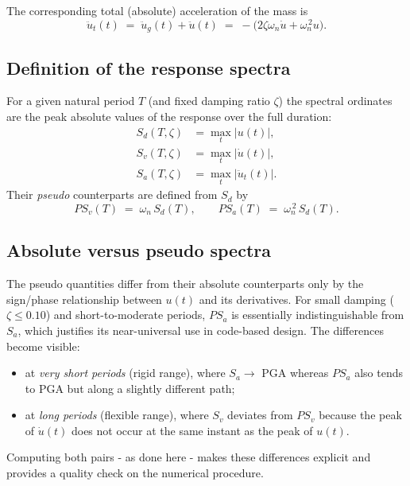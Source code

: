 \documentclass[11pt,a4paper]{article}
\begin{document}
The corresponding total (absolute) acceleration of the mass is
\begin{equation}
  \ddot{u}_t(t) \;=\; \ddot{u}_g(t) + \ddot{u}(t)
                  \;=\; -\bigl(2\zeta\omega_n\dot{u} + \omega_n^{\,2}u\bigr).
  \label{eq:abs}
\end{equation}

\subsection{Definition of the response spectra}
For a given natural period $T$ (and fixed damping ratio $\zeta$) the
spectral ordinates are the peak absolute values of the response over the
full duration:
\begin{align}
  S_d(T,\zeta)  &= \max_t \bigl|u(t)\bigr|,                       \\
  S_v(T,\zeta)  &= \max_t \bigl|\dot{u}(t)\bigr|,                 \\
  S_a(T,\zeta)  &= \max_t \bigl|\ddot{u}_t(t)\bigr|.
\end{align}
Their \emph{pseudo} counterparts are defined from $S_d$ by
\begin{equation}
  PS_v(T) \;=\; \omega_n\,S_d(T), \qquad
  PS_a(T) \;=\; \omega_n^{\,2}\,S_d(T).
  \label{eq:pseudo}
\end{equation}

\subsection{Absolute versus pseudo spectra}
The pseudo quantities differ from their absolute counterparts only by the
sign/phase relationship between $u(t)$ and its derivatives. For small
damping ($\zeta \le 0.10$) and short-to-moderate periods,
$PS_a$ is essentially indistinguishable from $S_a$, which justifies its
near-universal use in code-based design. The differences become visible:
\begin{itemize}[leftmargin=1.4em,itemsep=0.15em]
  \item at \emph{very short periods} (rigid range), where $S_a \to$ PGA
        whereas $PS_a$ also tends to PGA but along a slightly different
        path;
  \item at \emph{long periods} (flexible range), where $S_v$ deviates
        from $PS_v$ because the peak of $\dot{u}(t)$ does not occur at
        the same instant as the peak of $u(t)$.
\end{itemize}
Computing both pairs - as done here - makes these differences explicit and
provides a quality check on the numerical procedure.
\end{document}
